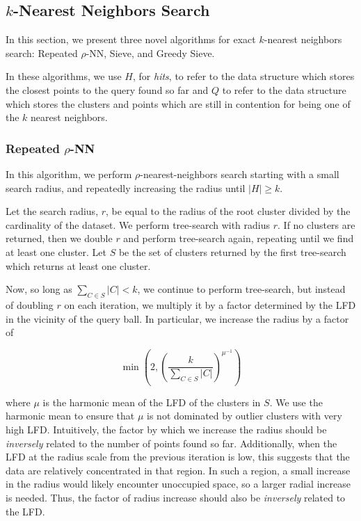 \subsection{\texorpdfstring{$k$}{k}-Nearest Neighbors Search}
\label{subsec:methods:knn-search}

In this section, we present three novel algorithms for exact $k$-nearest neighbors search:
Repeated $\rho$-NN, Sieve, and Greedy Sieve.

In these algorithms, we use $H$, for \emph{hits}, to refer to the data structure which stores the closest points to the query found so far and $Q$ to refer to the data structure which stores the clusters and points which are still in contention for being one of the $k$ nearest neighbors.


\subsubsection{Repeated \texorpdfstring{$\rho$}{p}-NN}
\label{subsubsec:methods:knn-search:repeated-rnn}

In this algorithm, we perform $\rho$-nearest-neighbors search starting with a small search radius, and repeatedly increasing the radius until $|H| \geq k$.

Let the search radius, $r$, be equal to the radius of the root cluster divided by the cardinality of the dataset.
We perform tree-search with radius $r$.
If no clusters are returned, then we double $r$ and perform tree-search again, repeating until we find at least one cluster.
Let $S$ be the set of clusters returned by the first tree-search which returns at least one cluster.

Now, so long as $\sum_{C \in S} |C| < k$, we continue to perform tree-search, but instead of doubling $r$ on each iteration, we multiply it by a factor determined by the LFD in the vicinity of the query ball. 
In particular, we increase the radius by a factor of

\begin{equation}
    \min \left(2, \left( {\frac{k}{\sum_{C \in S} |C|}} \right)^{\mu^{-1}} \right)
    \label{eq:repeated-rnn-factor}
\end{equation}

where $\mu$ is the harmonic mean of the LFD of the clusters in $S$.
We use the harmonic mean to ensure that $\mu$ is not dominated by outlier clusters with very high LFD. 
Intuitively, the factor by which we increase the radius should be \emph{inversely} related to the number of points found so far. 
Additionally, when the LFD at the radius scale from the previous iteration is low, this suggests that the data are relatively concentrated in that region.
In such a region, a small increase in the radius would likely encounter unoccupied space, so a larger radial increase is needed.
Thus, the factor of radius increase should also be \emph{inversely} related to the LFD.

